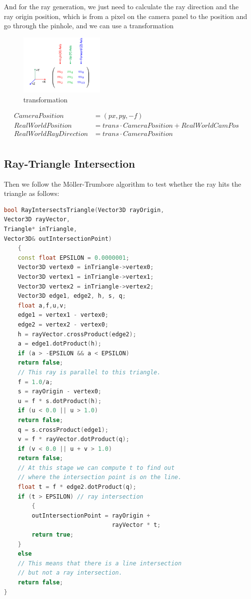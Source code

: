\documentclass[acmtog]{acmart}
\begin{document}
And for the ray generation, we just need to calculate the ray direction and the ray origin position, which is from a pixel on the camera panel to the position and go through the pinhole, and we can use a transformation
\begin{figure}[h]
	\centering
	\includegraphics[height = 3cm]{transformation.png}
	\caption{transformation}
\end{figure}

\begin{equation}
\begin{split}
	CameraPosition &= (px,py,-f) \\
	RealWorldPosition &= trans \cdot CameraPosition + RealWorldCamPos \\
	RealWorldRayDirection &= trans \cdot CameraPosition \\
\end{split}
\end{equation}

\subsection{Ray-Triangle Intersection}
Then we follow the Möller-Trumbore algorithm to test whether the ray hits the triangle as follows:
\begin{lstlisting}[language=C++]
bool RayIntersectsTriangle(Vector3D rayOrigin,
Vector3D rayVector,
Triangle* inTriangle,
Vector3D& outIntersectionPoint)
	{
	const float EPSILON = 0.0000001;
	Vector3D vertex0 = inTriangle->vertex0;
	Vector3D vertex1 = inTriangle->vertex1;
	Vector3D vertex2 = inTriangle->vertex2;
	Vector3D edge1, edge2, h, s, q;
	float a,f,u,v;
	edge1 = vertex1 - vertex0;
	edge2 = vertex2 - vertex0;
	h = rayVector.crossProduct(edge2);
	a = edge1.dotProduct(h);
	if (a > -EPSILON && a < EPSILON)
	return false;
    // This ray is parallel to this triangle.
	f = 1.0/a;
	s = rayOrigin - vertex0;
	u = f * s.dotProduct(h);
	if (u < 0.0 || u > 1.0)
	return false;
	q = s.crossProduct(edge1);
	v = f * rayVector.dotProduct(q);
	if (v < 0.0 || u + v > 1.0)
	return false;
	// At this stage we can compute t to find out
    // where the intersection point is on the line.
	float t = f * edge2.dotProduct(q);
	if (t > EPSILON) // ray intersection
		{
		outIntersectionPoint = rayOrigin +
                               rayVector * t;
		return true;
	}
	else
    // This means that there is a line intersection
    // but not a ray intersection.
	return false;
}
\end{lstlisting}
\end{document}
